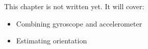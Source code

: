 \label{ch:ctl4}
\begin{keyidea}
This chapter is not written yet. It will cover:
\begin{itemize}[nosep]
  \item Combining gyroscope and accelerometer
  \item Estimating orientation
\end{itemize}
\end{keyidea}
